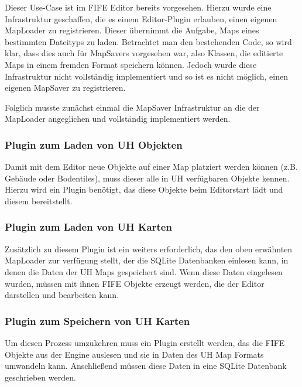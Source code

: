 Dieser Use-Case ist im FIFE Editor bereits vorgesehen. Hierzu wurde eine Infrastruktur geschaffen, die
es einem Editor-Plugin erlauben, einen eigenen MapLoader zu registrieren. Dieser übernimmt die
Aufgabe, Maps eines bestimmten Dateityps zu laden. Betrachtet man den bestehenden Code, so wird klar,
dass dies auch für MapSavers vorgesehen war, also Klassen, die editierte Maps in einem fremden Format
speichern können. Jedoch wurde diese Infrastruktur nicht vollständig implementiert und so ist es
nicht möglich, einen eigenen MapSaver zu registrieren.

Folglich musste zunächst einmal die MapSaver Infrastruktur an die der MapLoader angeglichen und vollständig
implementiert werden.

\subsubsection{Plugin zum Laden von UH Objekten}
Damit mit dem Editor neue Objekte auf einer Map platziert werden können (z.B. Gebäude oder Bodentiles),
muss dieser alle in UH verfügbaren Objekte kennen. Hierzu wird ein Plugin benötigt, das diese
Objekte beim Editorstart lädt und diesem bereitstellt.

\subsubsection{Plugin zum Laden von UH Karten}
Zusätzlich zu diesem Plugin ist ein weiters erforderlich, das den oben erwähnten MapLoader
zur verfügung stellt, der die SQLite Datenbanken einlesen kann, in denen die Daten der
UH Maps gespeichert sind. Wenn diese Daten eingelesen wurden, müssen mit ihnen FIFE Objekte
erzeugt werden, die der Editor darstellen und bearbeiten kann.

\subsubsection{Plugin zum Speichern von UH Karten}
Um diesen Prozess umzukehren muss ein Plugin erstellt werden, das die FIFE Objekte aus der
Engine auslesen und sie in Daten des UH Map Formats umwandeln kann. Anschließend müssen diese
Daten in eine SQLite Datenbank geschrieben werden.

